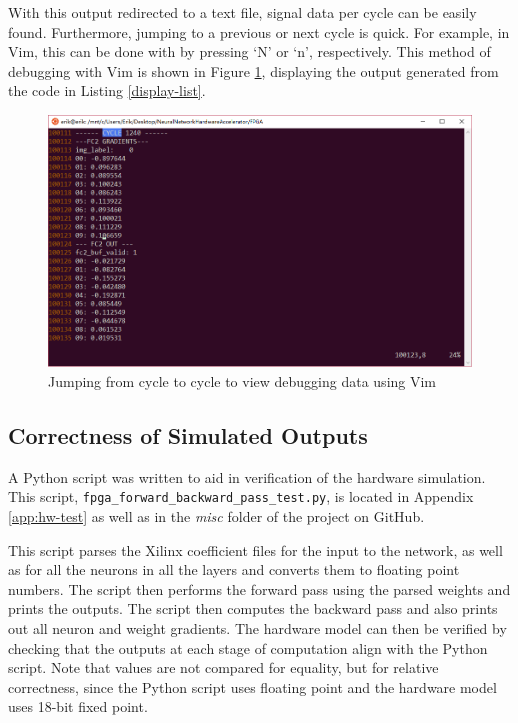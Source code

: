 With this output redirected to a text file, signal data per cycle can be easily found. Furthermore, jumping to a previous or next cycle is quick. For example, in Vim, this can be done with by pressing `N' or `n', respectively. This method of debugging with Vim is shown in Figure \ref{vim-out}, displaying the output generated from the code in Listing \ref{display-list}.
\begin{figure}
	\centering 
	\includegraphics[width=\textwidth]{figures/vim_output}
	\caption{Jumping from cycle to cycle to view debugging data using Vim}\label{vim-out}
\end{figure}

\subsection{Correctness of Simulated Outputs}
A Python script was written to aid in verification of the hardware simulation. This script, \texttt{fpga\_forward\_backward\_pass\_test.py}, is located in Appendix \ref{app:hw-test} as well as in the \textit{misc} folder of the project on GitHub.

This script parses the Xilinx coefficient files for the input to the network, as well as for all the neurons in all the layers and converts them to floating point numbers. The script then performs the forward pass using the parsed weights and prints the outputs. The script then computes the backward pass and also prints out all neuron and weight gradients. The hardware model can then be verified by checking that the outputs at each stage of computation align with the Python script. Note that values are not compared for equality, but for relative correctness, since the Python script uses floating point and the hardware model uses 18-bit fixed point.

